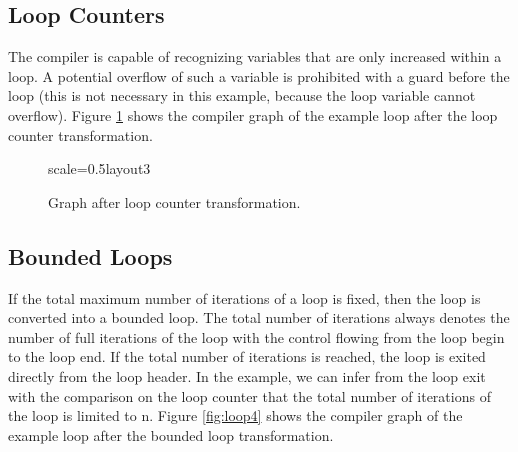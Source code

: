 \documentclass[twocolumn]{svjour3}
\begin{document}
\subsection{Loop Counters}
The compiler is capable of recognizing variables that are only increased within a loop.
A potential overflow of such a variable is prohibited with a guard before the loop (this is not necessary in this example, because the loop variable cannot overflow).
Figure \ref{fig:loop3} shows the compiler graph of the example loop after the loop counter transformation.


\begin{figure}[h]
  \centering
\begin{digraphenv}{scale=0.5}{layout3}
\end{digraphenv}
  \caption{Graph after loop counter transformation.}
  \label{fig:loop3}
\end{figure}

\subsection{Bounded Loops}

If the total maximum number of iterations of a loop is fixed, then the loop is converted into a bounded loop.
The total number of iterations always denotes the number of full iterations of the loop with the control flowing from the loop begin to the loop end.
If the total number of iterations is reached, the loop is exited directly from the loop header.
In the example, we can infer from the loop exit with the comparison on the loop counter that the total number of iterations of the loop is limited to n.
Figure \ref{fig:loop4} shows the compiler graph of the example loop after the bounded loop transformation.
\end{document}
